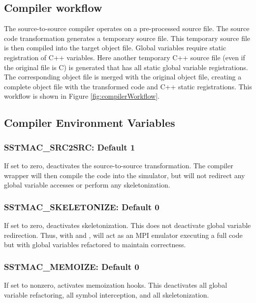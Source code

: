 \subsection{Compiler workflow}
The source-to-source compiler operates on a pre-processed source file.
The source code transformation generates a temporary source file.
This temporary source file is then compiled into the target object file.
Global variables require static registration of C++ variables.
Here another temporary C++ source file (even if the original file is C)
is generated that has all static global variable registrations.
The corresponding object file is merged with the original object file,
creating a complete \sstmacro object file with the transformed code and C++ static registrations.
This workflow is shown in Figure \ref{fig:compilerWorkflow}.

\subsection{Compiler Environment Variables}

\subsubsection{SSTMAC\_SRC2SRC: Default 1}
If set to zero, deactivates the source-to-source transformation. 
The compiler wrapper will then compile the code into the simulator, but will not redirect any global variable accesses or perform any skeletonization.

\subsubsection{SSTMAC\_SKELETONIZE: Default 0}
If set to zero, deactivates skeletonization. 
This does not deactivate global variable redirection.
Thus, with  and ,
\sstmacro will act as an MPI emulator executing a full code but with global variables refactored to maintain correctness.

\subsubsection{SSTMAC\_MEMOIZE: Default 0}
If set to nonzero, activates memoization hooks. 
This deactivates all global variable refactoring, all symbol interception, and all skeletonization.

